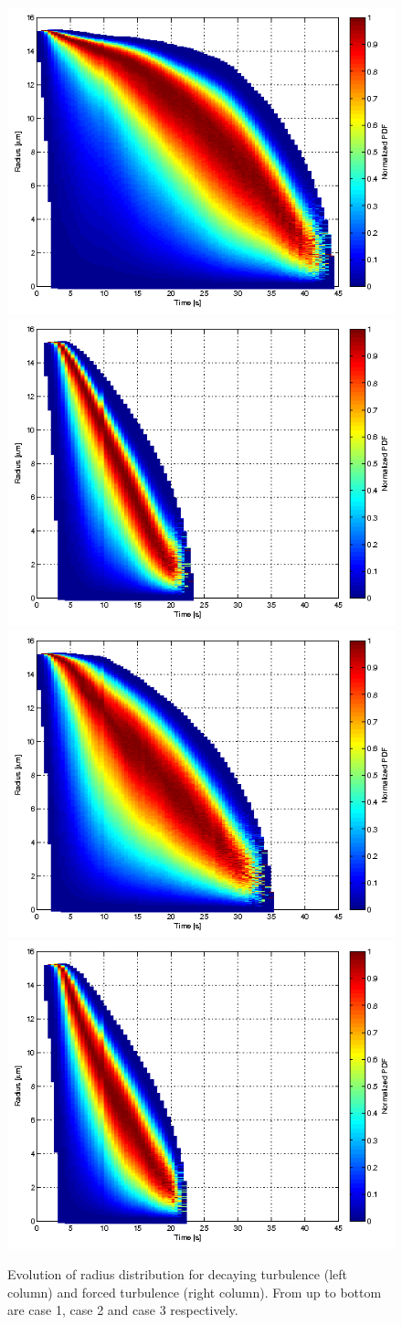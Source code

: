 \documentclass[draft,jgrga]{AGUTeX}
\begin{document}
\begin{article}
\begin{figure}[!htbp]
\includegraphics[width=0.48\linewidth]{Figures/pdf_radius_d2}
\includegraphics[width=0.48\linewidth]{Figures/pdf_radius_f2}\\
\includegraphics[width=0.48\linewidth]{Figures/pdf_radius_d3}
\includegraphics[width=0.48\linewidth]{Figures/pdf_radius_f3}
\caption{Evolution of radius distribution for decaying turbulence (left column) 
and forced turbulence (right column). From up to bottom are case 1, case 2 and case 3 respectively.}\label{fig:rad_distri}
\end{figure}


\end{article}
\end{document}
